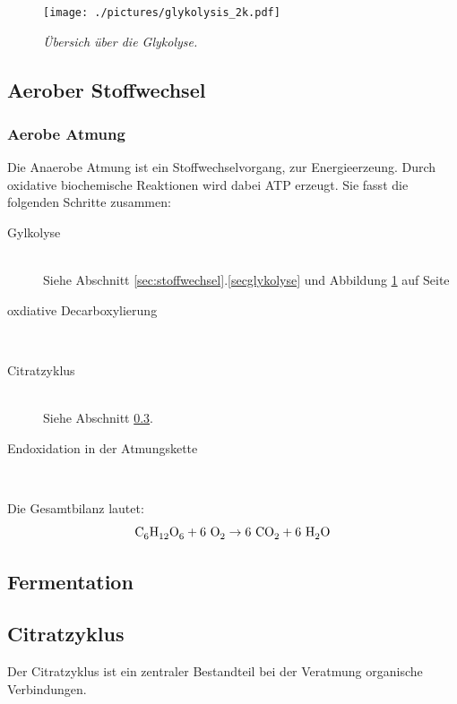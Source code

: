 \begin{figure}[htb!]
	\leavevmode
	\begin{center}
		\texttt{[image: ./pictures/glykolysis\_2k.pdf]}
	\end{center}
	\caption{\slshape{Übersich über die Glykolyse.}}
	\label{fig:glykolyse}
\end{figure}

\subsection{Aerober Stoffwechsel}

\subsubsection*{Aerobe Atmung}
Die Anaerobe Atmung ist ein Stoffwechselvorgang,
zur Energieerzeung.
Durch oxidative biochemische Reaktionen wird dabei ATP erzeugt.
Sie fasst die folgenden Schritte zusammen:

\begin{description}
	\item[Gylkolyse]	\hfill	\\
		Siehe Abschnitt \ref{sec:stoffwechsel}.\ref{secglykolyse} 
		und Abbildung \ref{fig:glykolyse} auf Seite \pageref{fig:glykolyse}
	\item[oxdiative Decarboxylierung]	\hfill	\\
	\item[Citratzyklus]	\hfill	\\
		Siehe Abschnitt \ref{sec:citratzyklus}.
	\item[Endoxidation in der Atmungskette]	\hfill	\\
\end{description}

Die Gesamtbilanz lautet:
\begin{equation}
	\ce{C6H12O6} + 6\ \ce{O2} \rightarrow 6\ \ce{CO2} + 6\ \ce{H2O}
	\label{eq:aerobeAtmung}
\end{equation}

\subsection{Fermentation}

\subsection{Citratzyklus}
\label{sec:citratzyklus}

Der Citratzyklus ist ein zentraler Bestandteil bei der Veratmung organische Verbindungen.

